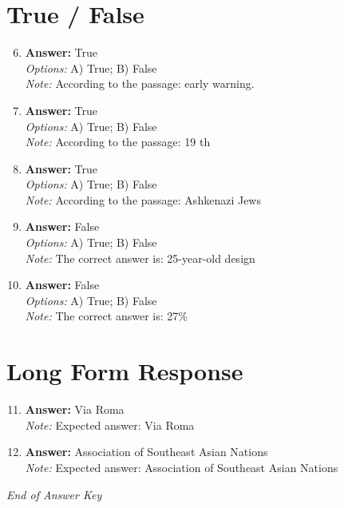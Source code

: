 \documentclass[12pt]{article}
\begin{document}
\section*{True / False}
\begin{enumerate}[label=\arabic*.]
\setcounter{enumi}{5}
\item \textbf{Answer:} True
\\ \textit{Options:} A) True; B) False
\\ \textit{Note:} According to the passage: early warning.
\item \textbf{Answer:} True
\\ \textit{Options:} A) True; B) False
\\ \textit{Note:} According to the passage: 19 th
\item \textbf{Answer:} True
\\ \textit{Options:} A) True; B) False
\\ \textit{Note:} According to the passage: Ashkenazi Jews
\item \textbf{Answer:} False
\\ \textit{Options:} A) True; B) False
\\ \textit{Note:} The correct answer is: 25-year-old design
\item \textbf{Answer:} False
\\ \textit{Options:} A) True; B) False
\\ \textit{Note:} The correct answer is: 27\%
\end{enumerate}

\section*{Long Form Response}
\begin{enumerate}[label=\arabic*.]
\setcounter{enumi}{10}
\item \textbf{Answer:} Via Roma
\\ \textit{Note:} Expected answer: Via Roma
\item \textbf{Answer:} Association of Southeast Asian Nations
\\ \textit{Note:} Expected answer: Association of Southeast Asian Nations
\end{enumerate}

\vfill
\noindent\textit{End of Answer Key}
\end{document}

